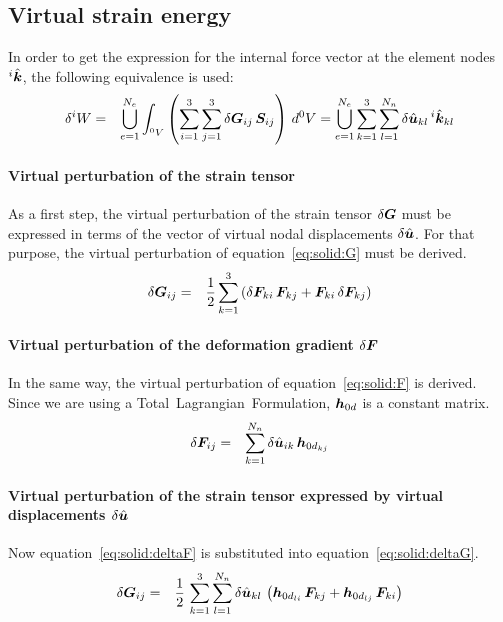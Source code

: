\subsection{Virtual strain energy}
In order to get the expression for the internal force vector at the element nodes $^i\hat{\bm{k}}$, the following equivalence is used:
\begin{eqnarray}
\delta ^iW & = & \bigcup_{e=1}^{N_e} \int_{^0V} \left(\sum_{i=1}^3\sum_{j=1}^3 \delta \bm{G}_{ij} \, \bm{S}_{ij} \right) \, d^0V = \bigcup_{e=1}^{N_e}\sum_{k=1}^{3} \sum_{l=1}^{N_n} \delta \hat{\bm{u}}_{kl} \, ^i\hat{\bm{k}}_{kl} \label{eq:solid:deltaWi}
\end{eqnarray}

\paragraph{Virtual perturbation of the strain tensor}
As a first step, the virtual perturbation of the strain tensor $\delta\bm{G}$ must be expressed in terms of the vector of virtual nodal displacements $\delta\hat{\bm{u}}$.
For that purpose, the virtual perturbation of equation~\ref{eq:solid:G} must be derived.
\begin{eqnarray}
\delta \bm{G}_{ij} & = & \frac{1}{2} \sum_{k=1}^3\left(\delta \bm{F}_{ki} \, \bm{F}_{kj} + \bm{F}_{ki} \, \delta \bm{F}_{kj}\right) \label{eq:solid:deltaG}
\end{eqnarray}

\paragraph{Virtual perturbation of the deformation gradient $\delta\bm{F}$}
In the same way, the virtual perturbation of equation~\ref{eq:solid:F} is derived.
Since we are using a Total~Lagrangian~Formulation, $\bm{h}_{0d}$ is a constant matrix.
\begin{eqnarray}
\delta \bm{F}_{ij} & = & \sum_{k=1}^{N_n} \delta \hat{\bm{u}}_{ik} \, \bm{h}_{0d_{kj}} \label{eq:solid:deltaF}
\end{eqnarray}

\paragraph{Virtual perturbation of the strain tensor expressed by virtual displacements $\delta{\hat{\bm{u}}}$}
Now equation~\ref{eq:solid:deltaF} is substituted into equation~\ref{eq:solid:deltaG}.
\begin{eqnarray}
\delta \bm{G}_{ij} & = & \frac{1}{2} \, \sum_{k=1}^3 \sum_{l=1}^{N_n} \delta \hat{\bm{u}}_{kl} \, \left( \bm{h}_{0d_{li}} \, \bm{F}_{kj} + \bm{h}_{0d_{lj}} \, \bm{F}_{ki} \right) \label{eq:solid:deltaG_F}
\end{eqnarray}

